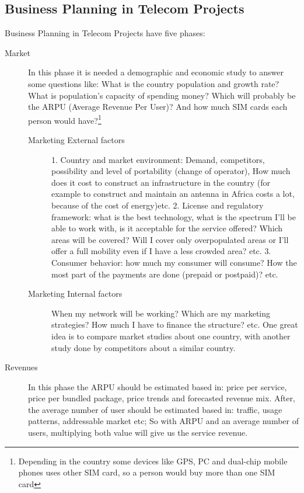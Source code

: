 \documentclass[a4paper,11pt]{article}
\begin{document}
\subsection{Business Planning in Telecom Projects}
Business Planning in Telecom Projects have five phases:

\begin{description}
\item[Market] In this phase it is needed a demographic and economic study to 
  answer some questions like: What is the  country population and growth  rate? What is  population's capacity of
  spending money?  Which will probably be  the ARPU (Average  Revenue Per User)?
  And  how much  SIM cards  each  person would  have?\footnote{Depending in  the
    country some devices like GPS, PC and dual-chip mobile phones uses other SIM card, so a
    person would buy more than one SIM card} 
\begin{description}
\item[Marketing External factors] {\color{blue}1.  Country and market environment:} Demand,
  competitors, possibility  and level of  portability (change of  operator), How
  much does it cost  to construct  an infrastructure  in the  country (for  example to
  construct and maintain an antenna in Africa costs a lot, because of the cost of energy)etc. {\color{blue}2.  License and
  regulatory framework:} what is the best technology, what is the spectrum I'll
  be able  to work with, is it  acceptable for the service  offered? Which areas
  will be  covered? Will I cover only  overpopulated areas or I'll  offer a full
  mobility even if  I have a less crowded area? etc.  {\color{blue}3. Consumer behavior:} how
  much my  consumer will  consume? How the  most part  of the payments  are done
  (prepaid or postpaid)? etc.

\item[Marketing Internal factors] When my  network will be working? Which are my
  marketing strategies? How much I have to finance the structure?  etc. One 
  great idea is to compare market studies about one country, with another study
  done by competitors about a similar country.

\end{description}

\item[Revenues] 
 In  this phase the ARPU should be estimated based in:  price per
  service,  price  per bundled  package,  price  trends  and forecasted  revenue
  mix.  After, the average  number of  user  should be estimated based  in: traffic,  usage   patterns, addressable market etc; So with {\color{red}ARPU} and an {\color{red}average number of users},
  multiplying both value will give us the {\color{red}service revenue.}


\end{description}
\end{document}
